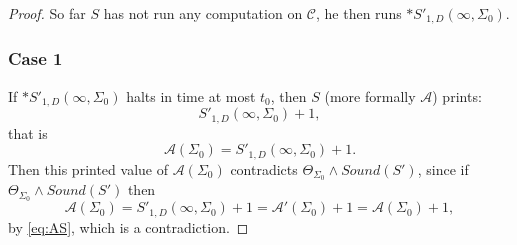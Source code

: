\documentclass[9pt,twocolumn,twoside,lineno]{pnas-new}
\numberwithin{equation}{section}
\theoremstyle{definition}
\theoremstyle{remark}
\begin{document}
\begin{proof}
   So far $S$ has not run any computation on $\mathcal{C} $, he then runs $*S'   _{1,D} (\infty, \Sigma _{0} )$.
\subsubsection* {Case 1}
   If $*S'   _{1,D} (\infty, \Sigma _{0} )$ halts in time at most $t _{0} $,  then  $S$ (more formally $\mathcal{A}$) prints:   $$S' _{1,D}  (\infty, \Sigma _{0} ) +1,  $$  that is $$\mathcal{A} (\Sigma _{0} )= S' _{1,D}  (\infty, \Sigma _{0} ) +1.$$  Then this printed value of $\mathcal{A} (\Sigma _{0} )$ contradicts $\Theta _{\Sigma _{0} } \land Sound (S') $, since if $\Theta _{\Sigma _{0} } \land Sound (S')$ then 
$$\mathcal{A} (\Sigma _{0} )= S' _{1,D}  (\infty, \Sigma _{0} ) +1 = \mathcal{A}' (\Sigma _{0} ) +1 = \mathcal{A} (\Sigma _{0} ) +1,$$ by \eqref{eq:AS}, which is a contradiction.



\end{proof}
\end{document}
